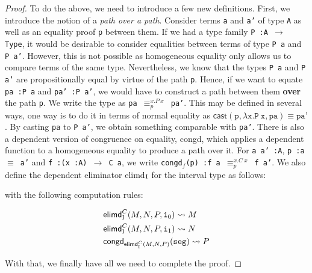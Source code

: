 \documentclass[12pt,twoside,maitrise]{dms}
\theoremstyle{definition}
\numberwithin{equation}{section}
\numberwithin{table}{chapter}
\numberwithin{figure}{chapter}
\newcommand\kw[1] {\textsf{#1}}
\newcommand\id[1] {\texttt{#1}}
\newcommand\fn[1] {\texttt{#1}}
\begin{document}
\begin{proof}
To do the above, we need to introduce a few new definitions. First, we introduce
the notion of a \emph{path over a path}\cite{licata2015cubical}. Consider terms
\id{a} and \id{a'} of type \id{A} as well as an equality proof \id{p} between
them. If we had a type family \fn{P :\@ A $\rightarrow$ Type}, it would be
desirable to consider equalities between terms of type \fn{P a} and \fn{P a'}.
However, this is not possible as homogeneous equality only allows us to compare
terms of the same type. Nevertheless, we know that the types \fn{P a} and \fn{P
  a'} are propositionally equal by virtue of the path \id{p}. Hence, if we want
to equate \fn{pa :\@ P a} and \fn{pa' :\@ P a'}, we would have to
construct a path between them \textbf{over} the path \id{p}. We write the type
as \fn{pa $\equiv^{x. P \ x}_{p}$ pa'}. This may be defined in several ways, one
way is to do it in terms of normal equality as $\kw{cast}(\id{p}, \lambda \id{x}
. \id{P} \ \id{x}, \id{pa}) \equiv \id{pa'}$. By casting \id{pa} to \id{P a'},
we obtain something comparable with \id{pa'}. There is also a dependent version
of congruence on equality, \kw{congd}, which applies a dependent function to a
homogeneous equality to produce a path over it. For \fn{a a' :\@ A}, \fn{p
  :\@ a $\equiv$ a'} and \fn{f :\@ (x :\@ A) $\rightarrow$ C a}, we write
\fn{\kw{congd}$_{f}$(p) :\@ f a $\equiv^{x. C \ x}_{p}$ f a'}. We also
define the dependent eliminator \kw{elimd}$_{\mathrm{I}}$ for the interval type as
follows:

\begin{prooftree*}
   \infer4{\oftype{\ctx, \oftype{i}{\bI}}{\kw{elimd}_{\bI}^{C} (M, N, P, i)}{C \ i}}
\end{prooftree*}


with the following computation rules:

\begin{align*}
  & \kw{elimd}_{\bI}^{C}(M, N, P, \ileft) \rightsquigarrow{} M \\
  & \kw{elimd}_{\bI}^{C}(M, N, P, \iright) \rightsquigarrow{} N \\
  & \kw{congd}_{\kw{elimd}_{\bI}^{C}(M, N, P)}(\id{seg}) \rightsquigarrow{} P
\end{align*}


With that, we finally have all we need to complete the proof.


\end{proof}
\end{document}
